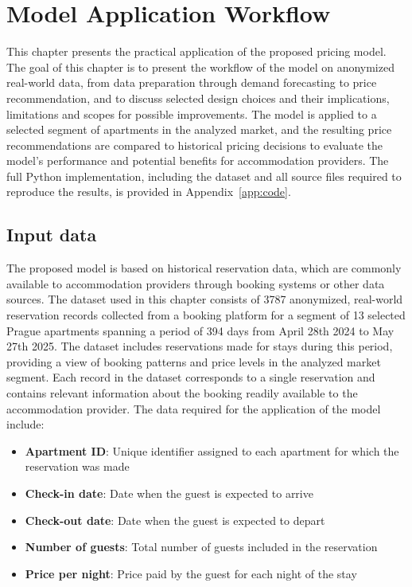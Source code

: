 \chapter{Model Application Workflow}

This chapter presents the practical application of the proposed pricing model. The goal of this chapter is to present the workflow of the model on anonymized real-world data, from data preparation through demand forecasting to price recommendation, and to discuss selected design choices and their implications, limitations and scopes for possible improvements. The model is applied to a selected segment of apartments in the analyzed market, and the resulting price recommendations are compared to historical pricing decisions to evaluate the model's performance and potential benefits for accommodation providers. The full Python implementation, including the dataset and all source files required to reproduce the results, is provided in Appendix~\ref{app:code}.

\section{Input data}

The proposed model is based on historical reservation data, which are commonly available to accommodation providers through booking systems or other data sources. The dataset used in this chapter consists of 3787 anonymized, real-world reservation records collected from a booking platform for a segment of 13 selected Prague apartments spanning a period of 394 days from April 28th 2024 to May 27th 2025. The dataset includes reservations made for stays during this period, providing a view of booking patterns and price levels in the analyzed market segment. Each record in the dataset corresponds to a single reservation and contains relevant information about the booking readily available to the accommodation provider. The data required for the application of the model include:
\begin{itemize}
    \item \textbf{Apartment ID}: Unique identifier assigned to each apartment for which the reservation was made
    \item \textbf{Check-in date}: Date when the guest is expected to arrive
    \item \textbf{Check-out date}: Date when the guest is expected to depart
    \item \textbf{Number of guests}: Total number of guests included in the reservation
    \item \textbf{Price per night}: Price paid by the guest for each night of the stay
\end{itemize}

